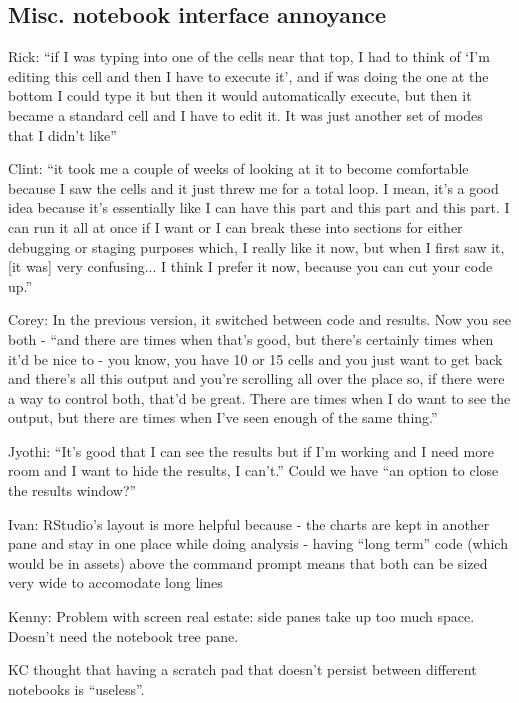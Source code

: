 \subsection{Misc. notebook interface annoyance}
Rick: ``if I was typing into one of the cells near that top, I had to think of `I'm editing this cell and then I have to execute it', and if was doing the one at the bottom I could type it but then it would automatically execute, but then it became a standard cell and I have to edit it. It was just another set of modes that I didn't like''

Clint: ``it took me a couple of weeks of looking at it to become comfortable because I saw the cells and it just threw me for a total loop. I mean, it's a good idea because it's essentially like I can have this part and this part and this part. I can run it all at once if I want or I can break these into sections for either debugging or staging purposes which, I really like it now, but when I first saw it, [it was] very confusing... I think I prefer it now, because you can cut your code up.''

Corey: In the previous version, it switched between code and results. Now you see both - ``and there are times when that's good, but there's certainly times when it'd be nice to - you know, you have 10 or 15 cells and you just want to get back and there's all this output and you're scrolling all over the place so, if there were a way to control both, that'd be great. There are times when I do want to see the output, but there are times when I've seen enough of the same thing.''

Jyothi: ``It's good that I can see the results but if I'm working and I need more room and I want to hide the results, I can't.” Could we have “an option to close the results window?”


Ivan: RStudio's layout is more helpful because
- the charts are kept in another pane and stay in one place while doing analysis
- having ``long term'' code (which would be in assets) above the command prompt means that both can be sized very wide to accomodate long lines

Kenny: Problem with screen real estate: side panes take up too much space. Doesn't need the notebook tree pane.

KC thought that having a scratch pad that doesn't persist between different notebooks is 
``useless''.


